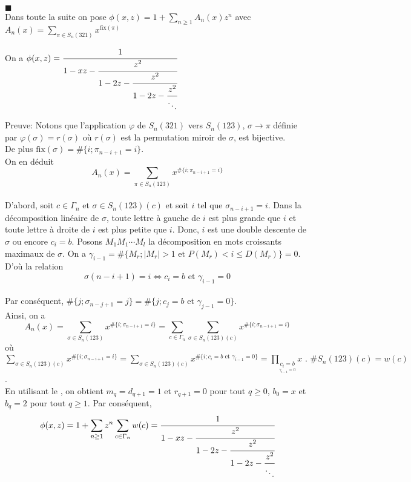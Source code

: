 $\blacksquare$\vspace{5pt}\\
Dans toute la suite on pose $\phi(x, z)= 1 + \sum\limits_{n\geq 1}A_{n}(x)z^{n}$ avec $A_{n}(x)=\sum\limits_{\pi \in S_{n}(321)}x^{\text{fix}(\pi)}$\\
\begin{proposition}
	On a $\phi(x,z)=\cfrac{1}{1-xz-\cfrac{z^{2}}{1-2z-\cfrac{z^{2}}{1-2z-\cfrac{z^{2}}{\ddots}}}}$
\end{proposition}
Preuve: Notons que l'application $\varphi$ de $S_{n}(321)$ vers $S_{n}(123)$, $\sigma \longrightarrow \pi$ définie par $\varphi(\sigma)=r(\sigma)$ où $r(\sigma)$ est la permutation miroir de $\sigma$, est bijective. \\De plus $\text{fix}(\sigma)=\#\{i; \pi_{n-i+1}=i\}$. \vspace{5pt}\\
On en déduit $$A_{n}(x)=\sum\limits_{\pi \in S_{n}(123)}x^{\#\{i; \pi_{n-i+1}=i\}}$$\\
D'abord, soit $c\in \Gamma_{n}$ et $\sigma \in S_{n}(123)(c)$ et soit $i$ tel que $\sigma_{n-i+1}=i$. Dans la décomposition linéaire de $\sigma $, toute lettre à gauche de $i$ est plus grande que $i$ et toute lettre à droite de $i$ est plus petite que $i$. Donc, $i$ est une double descente de $\sigma $ ou encore $c_{i}=b$.
Posons $M_{1}M_{1} \cdots M_{l}$ la décomposition en mots croissants maximaux de $\sigma$.
On a $\gamma_{i-1}=\#\{M_{r}; | M_{r} |>1 \text{ et }P(M_{r})<i\leq D(M_{r})\}=0$.\vspace{5pt}\\
D'où la relation $$\sigma(n-i+1)=i \iff c_{i}=b \text{ et }\gamma_{i-1}=0$$\\
Par conséquent, \text{ }$\#\{j; \sigma_{n-j+1}=j\}=\#\{j; c_{j}=b \text{ et }\gamma_{j-1}=0\}$.\vspace{10pt}\\
Ainsi, on a
$$A_{n}(x)=\sum\limits_{\sigma \in S_{n}(123)}x^{\#\{i; \sigma_{n-i+1}=i\}}=\sum\limits_{c\in \Gamma_{n}} \sum\limits_{\sigma \in S_{n}(123)(c)}x^{\#\{i; \sigma_{n-i+1}=i\}} $$ où $ \sum\limits_{\sigma \in S_{n}(123)(c)}x^{\#\{i; \sigma_{n-i+1}=i\}} = \sum\limits_{\sigma \in S_{n}(123)(c)}x^{\#\{i; c_{i}=b \text{ et }\gamma_{i-1}=0\}} = \prod\limits_{\underset{\gamma_{i-1}=0}{c_{i}=b}}x \text{ . }\#S_{n}(123)(c)=w(c)$.\\
En utilisant le , on obtient  $m_{q}=d_{q+1}=1$ et $r_{q+1}=0$ pour tout $q\geq 0$, $b_{0}=x$ et $b_{q}=2$ pour tout $q\geq 1$.
Par conséquent, $$\phi(x, z) = 1 + \sum\limits_{n\geq 1}z^{n} \sum\limits_{c\in \Gamma_{n}}w(c) = \cfrac{1}{1-xz-\cfrac{z^{2}}{1-2z-\cfrac{z^{2}}{1-2z-\cfrac{z^{2}}{\ddots}}}}$$\\

